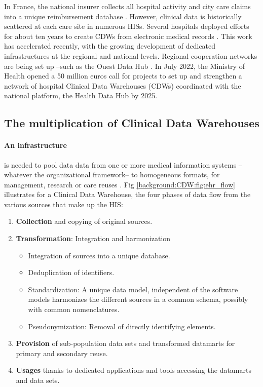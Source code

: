 \documentclass[french,12pt,twoside,a4paper]{book}
\begin{document}
In France, the national insurer collects all hospital activity and city care
claims into a unique reimbursement database \cite{tuppin_value_2017}. However,
clinical data is historically scattered at each care site in numerous HISs.
Several hospitals deployed efforts for about ten years to create CDWs from
electronic medical records
\cite{cuggia_roogle_2011,jannot_georges_2017,garcelon_finding_2017,wack_installation_2017,daniel_initializing_2018,malafaye_mise_2018,artemova_predimed_2019,lelong_building_2019,conan_les_2021,
lamer_development_2022}. This work has accelerated recently, with the growing
development of dedicated infrastructures at the regional and national levels.
Regional cooperation networks are being set up --such as the Ouest Data Hub
\cite{hugo_2022}. In July 2022, the Ministry of Health opened a 50 million euros
call for projects to set up and strengthen a network of hospital Clinical Data
Warehouses (CDWs) coordinated with the national platform, the Health Data Hub by
2025.

\subsection{The multiplication of Clinical Data Warehouses}\label{subsec:cdw:cdw_definition}

\paragraph{An infrastructure} is needed to pool data data from one or more
medical information systems --whatever the organizational framework-- to
homogeneous formats, for management, research or care reuses
\cite{chute_enterprise_2010,pavlenko_implementation_2020}. Fig
\ref{background:CDW:fig:ehr_flow} illustrates for a Clinical Data Warehouse, the
four phases of data flow from the various sources that make up the HIS:

\begin{enumerate}
  \item \textbf{Collection} and copying of original sources.
  \item \textbf{Transformation}: Integration and harmonization
        \begin{itemize}
          \item Integration of sources into a unique database.
          \item Deduplication of identifiers.
          \item Standardization: A unique data model, independent of the
                software models harmonizes the different sources in a common schema,
                possibly with common nomenclatures.
          \item Pseudonymization: Removal of directly identifying elements.
        \end{itemize}
  \item \textbf{Provision} of sub-population data sets and transformed datamarts
        for primary and secondary reuse.
  \item \textbf{Usages} thanks to dedicated applications and tools accessing the
        datamarts and data sets.
\end{enumerate}
\end{document}
